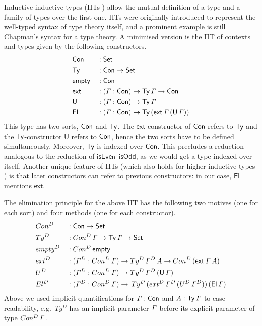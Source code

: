 \documentclass[a4paper,UKenglish,cleveref, autoref]{lipics-v2019}
\begin{document}
Inductive-inductive types (IITs \cite{forsberg-phd}) allow the mutual
definition of a type and a family of types over the first one. IITs
were originally introduced to represent the well-typed syntax of type
theory itself, and a prominent example is still Chapman's
\cite{chapman09eatitself} syntax for a type theory. A minimised version
is the IIT of contexts and types given by the following constructors.
\begin{alignat*}{5}
  & \mathsf{Con} && : \mathsf{Set} \\
  & \mathsf{Ty} && : \mathsf{Con}\rightarrow\mathsf{Set} \\
  & \mathsf{empty} && : \mathsf{Con} \\
  & \mathsf{ext} && : (\mathit{\Gamma}:\mathsf{Con})\rightarrow\mathsf{Ty}\,\mathit{\Gamma}\rightarrow\mathsf{Con} \\
  & \mathsf{U} && : (\mathit{\Gamma}:\mathsf{Con})\rightarrow\mathsf{Ty}\,\mathit{\Gamma} \\
  & \mathsf{El} && : (\mathit{\Gamma}:\mathsf{Con})\rightarrow\mathsf{Ty}\,(\mathsf{ext}\,\mathit{\Gamma}\,(\mathsf{U}\,\mathit{\Gamma}))
\end{alignat*}
This type has two sorts, $\mathsf{Con}$ and $\mathsf{Ty}$. The $\mathsf{ext}$ constructor of
$\mathsf{Con}$ refers to $\mathsf{Ty}$ and the $\mathsf{Ty}$-constructor $\mathsf{U}$ refers to $\mathsf{Con}$,
hence the two sorts have to be defined simultaneously. Moreover, $\mathsf{Ty}$ is
indexed over $\mathsf{Con}$. This precludes a reduction analogous to the reduction of
$\mathsf{isEven}$--$\mathsf{isOdd}$, as we would get a type indexed over
itself. Another unique feature of IITs (which also holds for higher inductive
types \cite{HoTTbook}) is that later constructors can refer to previous
constructors: in our case, $\mathsf{El}$ mentions
$\mathsf{ext}$.

The elimination principle for the above IIT has the following two
motives (one for each sort) and four methods (one for each
constructor).
\begin{alignat*}{5}
  & Con^D && : \mathsf{Con}\rightarrow\mathsf{Set} \\
  & Ty^D && : Con^D\,\mathit{\Gamma}\rightarrow\mathsf{Ty}\,\mathit{\Gamma}\rightarrow\mathsf{Set} \\
  & {empty}^D && : Con^D\,\mathsf{empty} \\
  & {ext}^D && : (\mathit{\Gamma}^D:Con^D\,\mathit{\Gamma})\rightarrow Ty^D\,\mathit{\Gamma}^D\,A\rightarrow Con^D\,(\mathsf{ext}\,\mathit{\Gamma}\,A) \\
  & U^D && : (\mathit{\Gamma}^D:Con^D\,\mathit{\Gamma})\rightarrow Ty^D\,\mathit{\Gamma}^D\,(\mathsf{U}\,\mathit{\Gamma}) \\
  & El^D && : (\mathit{\Gamma}^D:Con^D\,\mathit{\Gamma})\rightarrow\,Ty^D\,({ext}^D\,\mathit{\Gamma}^D\,(U^D\,\mathit{\Gamma}^D))\,(\mathsf{El}\,\mathit{\Gamma})
\end{alignat*}
Above we used implicit quantifications for $\mathit{\Gamma}:\mathsf{Con}$ and
$A:\mathsf{Ty}\,\mathit{\Gamma}$ to ease readability, e.g.\ $Ty^D$ has an implicit
parameter $\mathit{\Gamma}$ before its explicit parameter of type
$Con^D\,\mathit{\Gamma}$.
\end{document}
